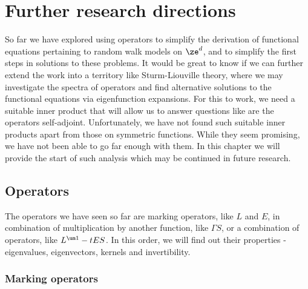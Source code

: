 \chapter{Further research directions}

So far we have explored using operators to simplify the derivation of functional equations pertaining to random walk models on $\ze^d$, and to simplify the first steps in solutions to these problems. It would be great to know if we can further extend the work into a territory like Sturm-Liouville theory, where we may investigate the spectra of operators and find alternative solutions to the functional equations via eigenfunction expansions. For this to work, we need a suitable inner product that will allow us to answer questions like are the operators self-adjoint. Unfortunately, we have not found such suitable inner products apart from those on symmetric functions. While they seem promising, we have not been able to go far enough with them. In this chapter we will provide the start of such analysis which may be continued in future research.

\section{Operators}

The operators we have seen so far are marking operators, like $L$ and $E$, in combination of multiplication by another function, like $\Gamma S$, or a combination of operators, like $L^{\um 1} - tES$. In this order, we will find out their properties - eigenvalues, eigenvectors, kernels and invertibility.


\subsection{Marking operators}

